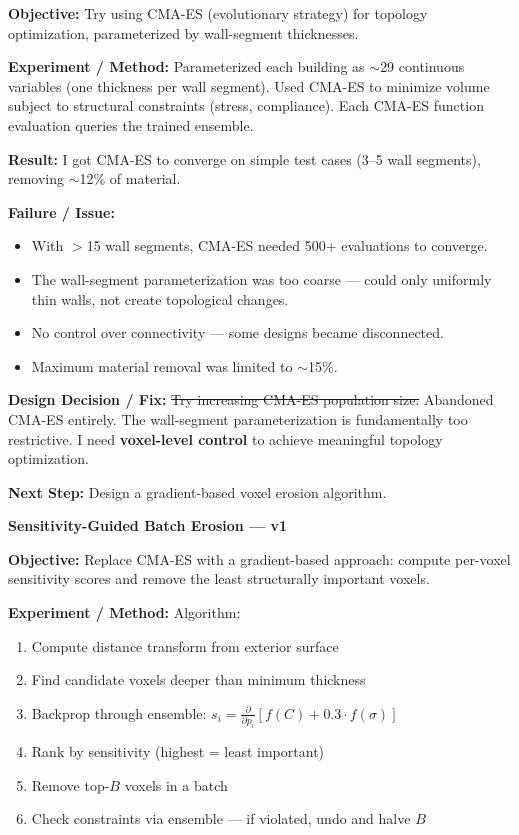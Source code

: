 \documentclass[11pt, letterpaper]{article}
\newcounter{entrynum}
\newcommand{\entry}[2]{%
  \refstepcounter{entrynum}%
  \vspace{6mm}%
  \noindent\begin{tcolorbox}[
    colback=bglight, colframe=entryblue,
    boxrule=1pt, arc=3pt,
    title={\textbf{Entry \theentrynum}\hfill\textbf{#1}},
    fonttitle=\large\color{white},
    colbacktitle=entryblue,
    left=3mm, right=3mm, top=2mm, bottom=2mm
  ]
  {\large\bfseries\color{entryblue} #2}
  \end{tcolorbox}
  \vspace{-1mm}%
}
\newcommand{\objective}{\par\textbf{\color{entryblue}Objective:} }
\newcommand{\experiment}{\par\textbf{\color{entryblue}Experiment / Method:} }
\newcommand{\result}{\par\textbf{\color{entryblue}Result:} }
\newcommand{\failure}{\par\textbf{\color{failred}Failure / Issue:} }
\newcommand{\fix}{\par\textbf{\color{fixgreen}Design Decision / Fix:} }
\newcommand{\nextstep}{\par\textbf{\color{notegray}Next Step:} }
\begin{document}
\objective
Try using CMA-ES (evolutionary strategy) for topology optimization,
parameterized by wall-segment thicknesses.

\experiment
Parameterized each building as $\sim$29 continuous variables (one thickness
per wall segment). Used CMA-ES to minimize volume subject to structural
constraints (stress, compliance). Each CMA-ES function evaluation queries
the trained ensemble.

\result
I got CMA-ES to converge on simple test cases (3--5 wall segments), removing
$\sim$12\% of material.

\failure
\begin{itemize}[nosep]
  \item With $>$15 wall segments, CMA-ES needed 500+ evaluations to converge.
  \item The wall-segment parameterization was too coarse --- could only
    uniformly thin walls, not create topological changes.
  \item No control over connectivity --- some designs became disconnected.
  \item Maximum material removal was limited to $\sim$15\%.
\end{itemize}

\fix
\sout{Try increasing CMA-ES population size.} Abandoned CMA-ES entirely.
The wall-segment parameterization is fundamentally too restrictive. I need
\textbf{voxel-level control} to achieve meaningful topology optimization.

\nextstep
Design a gradient-based voxel erosion algorithm.

\entry{February 21, 2026 (evening)}{Sensitivity-Guided Batch Erosion --- v1}

\objective
Replace CMA-ES with a gradient-based approach: compute per-voxel sensitivity
scores and remove the least structurally important voxels.

\experiment
Algorithm:
\begin{enumerate}[nosep]
  \item Compute distance transform from exterior surface
  \item Find candidate voxels deeper than minimum thickness
  \item Backprop through ensemble: $s_i = \frac{\partial}{\partial p_i}
    [f(C) + 0.3 \cdot f(\sigma)]$
  \item Rank by sensitivity (highest = least important)
  \item Remove top-$B$ voxels in a batch
  \item Check constraints via ensemble --- if violated, undo and halve $B$
\end{enumerate}
\end{document}
